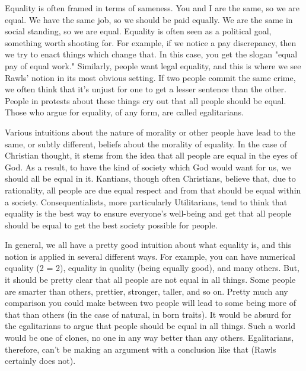 Equality is often framed in terms of sameness. You and I are the same, so we are equal. We have the same job, so we should be paid equally. We are the same in social standing, so we are equal. Equality is often seen as a political goal, something worth shooting for. For example, if we notice a pay discrepancy, then we try to enact things which change that. In this case, you get the slogan "equal pay of equal work." Similarly, people want legal equality, and this is where we see Rawls' notion in its most obvious setting. If two people commit the same crime, we often think that it's unjust for one to get a lesser sentence than the other. People in protests about these things cry out that all people should be equal. Those who argue for equality, of any form, are called egalitarians.

Various intuitions about the nature of morality or other people have lead to the same, or subtly different, beliefs about the morality of equality.  In the case of Christian thought, it stems from the idea that all people are equal in the eyes of God. As a result, to have the kind of society which God would want for us, we should all be equal in it. Kantians, though often Christians, believe that, due to rationality, all people are due equal respect and from that should be equal within a society. Consequentialists, more particularly Utilitarians, tend to think that equality is the best way to ensure everyone’s well-being and get that all people should be equal to get the best society possible for people.

In general, we all have a pretty good intuition about what equality is, and this notion is applied in several different ways. For example, you can have numerical equality (2 = 2), equality in quality (being equally good), and many others. But, it should be pretty clear that all people are not equal in all things. Some people are smarter than others, prettier, stronger, taller, and so on. Pretty much any comparison you could make between two people will lead to some being more of that than others (in the case of natural, in born traits). It would be absurd for the egalitarians to argue that people should be equal in all things. Such a world would be one of clones, no one in any way better than any others. Egalitarians, therefore, can’t be making an argument with a conclusion like that (Rawls certainly does not).

